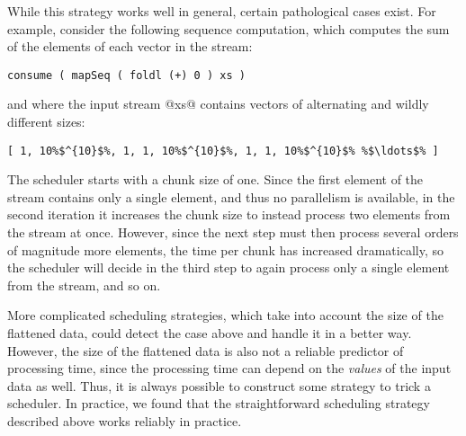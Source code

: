 While this strategy works well in general, certain pathological cases exist. For example, consider the following sequence computation, which computes the sum of the elements of each vector in the stream:
%
\begin{lstlisting}
consume ( mapSeq ( foldl (+) 0 ) xs )
\end{lstlisting}
%
%
and where the input stream @xs@ contains vectors of alternating and wildly
different sizes:
%
\begin{lstlisting}
[ 1, 10%$^{10}$%, 1, 1, 10%$^{10}$%, 1, 1, 10%$^{10}$% %$\ldots$% ]
\end{lstlisting}
%
The scheduler starts with a chunk size of one. Since the first element of the
stream contains only a single element, and thus no parallelism is available, in
the second iteration it increases the chunk size to instead process two elements
from the stream at once. However, since the next step must then process several
orders of magnitude more elements, the time per chunk has increased
dramatically, so the scheduler will decide in the third step to again process
only a single element from the stream, and so on.


More complicated scheduling strategies, which take into account the size of the
flattened data, could detect the case above and handle it in a better way.
However, the size of the flattened data is also not a reliable predictor of
processing time, since the processing time can depend on the \emph{values} of
the input data as well. Thus, it is always possible to construct some strategy
to trick a scheduler. In practice, we found that the straightforward scheduling
strategy described above works reliably in practice.

